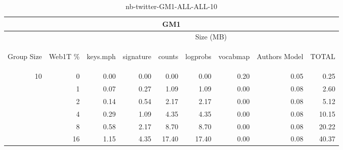 \begin{center}
\begin{table}[htbp] 
 \begin{center}
\begin{tabular}{ | r | r | r | r | r | r | r | r | r |}
\hline
\multicolumn{9}{|c|}{GM1}\\
\hline
 & & \multicolumn{7}{|c|}{Size (MB)}\\ \cline{3-9}
\begin{sideways}Group Size\end{sideways} & \begin{sideways}Web1T \% \end{sideways} & \begin{sideways}keys.mph\end{sideways} & \begin{sideways}signature\end{sideways} & \begin{sideways}counts\end{sideways} & \begin{sideways}logprobs\end{sideways} & \begin{sideways}vocabmap\end{sideways} & \begin{sideways}Authors Model \end{sideways} & \begin{sideways}TOTAL\end{sideways}\\
\hline
\multirow{5}{*}{10}
 & 0 & 0.00 & 0.00 & 0.00 & 0.00 & 0.20 & 0.05 & 0.25\\ \cline{2-9}
 & 1 & 0.07 & 0.27 & 1.09 & 1.09 & 0.00 & 0.08 & 2.60\\ \cline{2-9}
 & 2 & 0.14 & 0.54 & 2.17 & 2.17 & 0.00 & 0.08 & 5.12\\ \cline{2-9}
 & 4 & 0.29 & 1.09 & 4.35 & 4.35 & 0.00 & 0.08 & 10.15\\ \cline{2-9}
 & 8 & 0.58 & 2.17 & 8.70 & 8.70 & 0.00 & 0.08 & 20.22\\ \cline{2-9}
 & 16 & 1.15 & 4.35 & 17.40 & 17.40 & 0.00 & 0.08 & 40.37\\ \cline{2-9}
\hline
\end{tabular}
\caption{nb-twitter-GM1-ALL-ALL-10}
\label{table:nb-twitter-GM1-ALL-ALL-10}
\end{center}
 \end{table}
\end{center}

